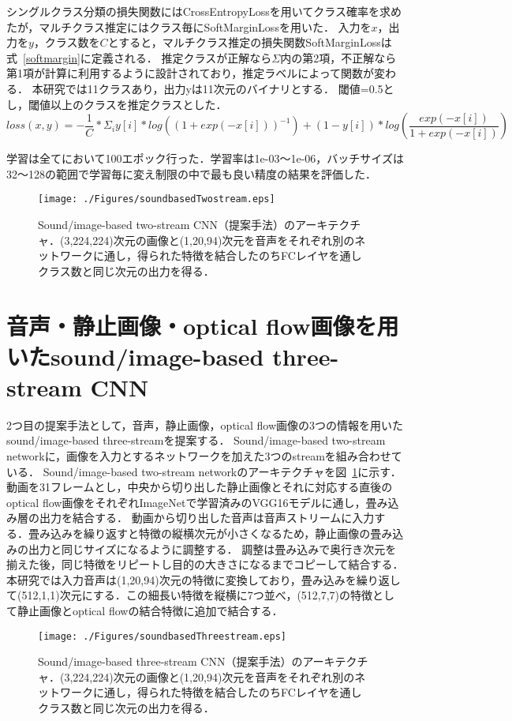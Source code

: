 シングルクラス分類の損失関数にはCrossEntropyLossを用いてクラス確率を求めたが，マルチクラス推定にはクラス毎にSoftMarginLossを用いた．
入力を$x$，出力を$y$，クラス数を$C$とすると，マルチクラス推定の損失関数SoftMarginLossは式~\ref{softmargin}に定義される．
推定クラスが正解なら$\Sigma$内の第2項，不正解なら第1項が計算に利用するように設計されており，推定ラベルによって関数が変わる．
本研究では11クラスあり，出力yは11次元のバイナリとする．
閾値=0.5とし，閾値以上のクラスを推定クラスとした．
\begin{equation}
\label{softmargin}
loss(x, y) = -\frac{1}{C} * \Sigma_{i} y[i] * log((1+exp(-x[i]))^{-1}) + (1 - y[i]) * log(\frac{exp(-x[i])}{1+exp(-x[i])})
\end{equation}

学習は全てにおいて100エポック行った．学習率は1e-03〜1e-06，バッチサイズは32〜128の範囲で学習毎に変え制限の中で最も良い精度の結果を評価した．


\begin{figure}[htbp]
 \begin{center}
  \texttt{[image: ./Figures/soundbasedTwostream.eps]}
  \caption{Sound/image-based two-stream CNN（提案手法）のアーキテクチャ．(3,224,224)次元の画像と(1,20,94)次元を音声をそれぞれ別のネットワークに通し，得られた特徴を結合したのちFCレイヤを通しクラス数と同じ次元の出力を得る．}
  \label{sound-two-stream}
 \end{center}
\end{figure}



\section{音声・静止画像・optical flow画像を用いたsound/image-based three-stream CNN}
2つ目の提案手法として，音声，静止画像，optical flow画像の3つの情報を用いたsound/image-based three-streamを提案する．
Sound/image-based two-stream networkに，画像を入力とするネットワークを加えた3つのstreamを組み合わせている．
Sound/image-based two-stream networkのアーキテクチャを図~\ref{sound-two-stream}に示す．
動画を31フレームとし，中央から切り出した静止画像とそれに対応する直後のoptical flow画像をそれぞれImageNetで学習済みのVGG16モデルに通し，畳み込み層の出力を結合する．
動画から切り出した音声は音声ストリームに入力する．畳み込みを繰り返すと特徴の縦横次元が小さくなるため，静止画像の畳み込みの出力と同じサイズになるように調整する．
調整は畳み込みで奥行き次元を揃えた後，同じ特徴をリピートし目的の大きさになるまでコピーして結合する．
本研究では入力音声は(1,20,94)次元の特徴に変換しており，畳み込みを繰り返して(512,1,1)次元にする．この細長い特徴を縦横に7つ並べ，(512,7,7)の特徴として静止画像とoptical flowの結合特徴に追加で結合する．

\begin{figure}[htbp]
 \begin{center}
  \texttt{[image: ./Figures/soundbasedThreestream.eps]}
  \caption{Sound/image-based three-stream CNN（提案手法）のアーキテクチャ．(3,224,224)次元の画像と(1,20,94)次元を音声をそれぞれ別のネットワークに通し，得られた特徴を結合したのちFCレイヤを通しクラス数と同じ次元の出力を得る．}
  \label{sound-three-stream}
 \end{center}
\end{figure}
